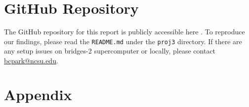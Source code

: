 \documentclass{article}
\begin{document}
\section{GitHub Repository}
The GitHub repository for this report is publicly accessible here \cite{proj3-repo}. To reproduce our findings, please read the \verb|README.md| under the \verb|proj3| directory. If there are any setup issues on bridges-2 supercomputer or locally, please contact \href{mailto:bcpark@ncsu.edu}{bcpark@ncsu.edu}.




\newpage
\section{Appendix}
\end{document}
